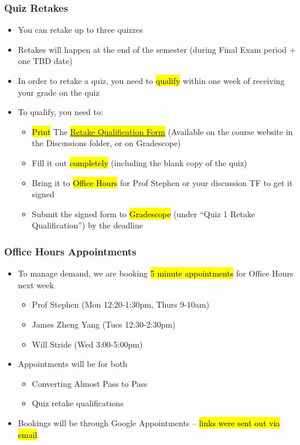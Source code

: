 \begin{frame}
\frametitle{Quiz Retakes}
    \begin{itemize}
        \item You can retake up to three quizzes
        \item Retakes will happen at the end of the semester (during Final Exam period + one TBD date)
        \item In order to retake a quiz, you need to \hl{qualify} within one week of receiving your grade on the quiz
        \item To qualify, you need to:
        \begin{itemize}
            \item \hl{Print} The \hl{\href{https://learn.bu.edu/ultra/courses/_246685_1/outline/file/_16630786_1}{Retake Qualification Form}} (Available on the course website in the Discussions folder, or on Gradescope)
            \item Fill it out \hl{completely} (including the blank copy of the quiz)
            \item Bring it to \hl{Office Hours} for Prof Stephen or your discussion TF to get it signed
            \item Submit the signed form to \hl{Gradescope} (under ``Quiz 1 Retake Qualification'') by the deadline
        \end{itemize}
    \end{itemize}
\end{frame}

\begin{frame}
    \frametitle{Office Hours Appointments}
    \begin{itemize}
        \item To manage demand, we are booking \hl{5 minute appointments} for Office Hours next week
        \begin{itemize}
            \item Prof Stephen (Mon 12:20-1:30pm, Thurs 9-10am)
            \item James Zheng Yang (Tues 12:30-2:30pm)
            \item Will Stride (Wed 3:00-5:00pm)
        \end{itemize}
        \item Appointments will be for both
        \begin{itemize}
            \item Converting Almost Pass to Pass
            \item Quiz retake qualifications
        \end{itemize}
        \item Bookings will be through Google Appointments -- \hl{links were sent out via email}
    \end{itemize}
\end{frame}


